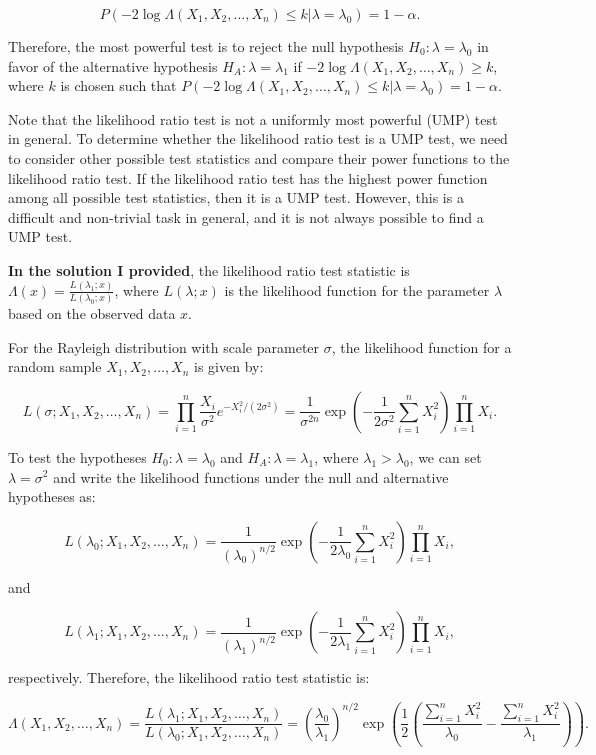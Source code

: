 \documentclass[11pt]{article}
\begin{document}
$$ P(-2\log\Lambda(X_1,X_2,\ldots,X_n) \leq k | \lambda = \lambda_0) = 1 - \alpha. $$

Therefore, the most powerful test is to reject the null hypothesis $H_0: \lambda=\lambda_0$ in favor of the alternative hypothesis $H_A: \lambda=\lambda_1$ if $-2\log\Lambda(X_1,X_2,\ldots,X_n) \geq k$, where $k$ is chosen such that $P(-2\log\Lambda(X_1,X_2,\ldots,X_n) \leq k | \lambda = \lambda_0) = 1 - \alpha$.

Note that the likelihood ratio test is not a uniformly most powerful (UMP) test in general. To determine whether the likelihood ratio test is a UMP test, we need to consider other possible test statistics and compare their power functions to the likelihood ratio test. If the likelihood ratio test has the highest power function among all possible test statistics, then it is a UMP test. However, this is a difficult and non-trivial task in general, and it is not always possible to find a UMP test.

\textbf{In the solution I provided}, the likelihood ratio test statistic is $\Lambda(x) = \frac{L(\lambda_1;x)}{L(\lambda_0;x)}$, where $L(\lambda;x)$ is the likelihood function for the parameter $\lambda$ based on the observed data $x$.

For the Rayleigh distribution with scale parameter $\sigma$, the likelihood function for a random sample $X_1, X_2, \ldots, X_n$ is given by:

$$ L(\sigma; X_1, X_2, \ldots, X_n) = \prod_{i=1}^n \frac{X_i}{\sigma^2} e^{-X_i^2/(2\sigma^2)} = \frac{1}{\sigma^{2n}} \exp\left(-\frac{1}{2\sigma^2} \sum_{i=1}^n X_i^2\right) \prod_{i=1}^n X_i. $$

To test the hypotheses $H_0: \lambda = \lambda_0$ and $H_A: \lambda = \lambda_1$, where $\lambda_1 > \lambda_0$, we can set $\lambda = \sigma^2$ and write the likelihood functions under the null and alternative hypotheses as:

$$ L(\lambda_0; X_1, X_2, \ldots, X_n) = \frac{1}{(\lambda_0)^{n/2}} \exp\left(-\frac{1}{2\lambda_0} \sum_{i=1}^n X_i^2\right) \prod_{i=1}^n X_i, $$

and

$$ L(\lambda_1; X_1, X_2, \ldots, X_n) = \frac{1}{(\lambda_1)^{n/2}} \exp\left(-\frac{1}{2\lambda_1} \sum_{i=1}^n X_i^2\right) \prod_{i=1}^n X_i, $$

respectively. Therefore, the likelihood ratio test statistic is:

$$ \Lambda(X_1, X_2, \ldots, X_n) = \frac{L(\lambda_1; X_1, X_2, \ldots, X_n)}{L(\lambda_0; X_1, X_2, \ldots, X_n)} = \left(\frac{\lambda_0}{\lambda_1}\right)^{n/2} \exp\left(\frac{1}{2}\left(\frac{\sum_{i=1}^n X_i^2}{\lambda_0} - \frac{\sum_{i=1}^n X_i^2}{\lambda_1}\right)\right). $$
\end{document}
